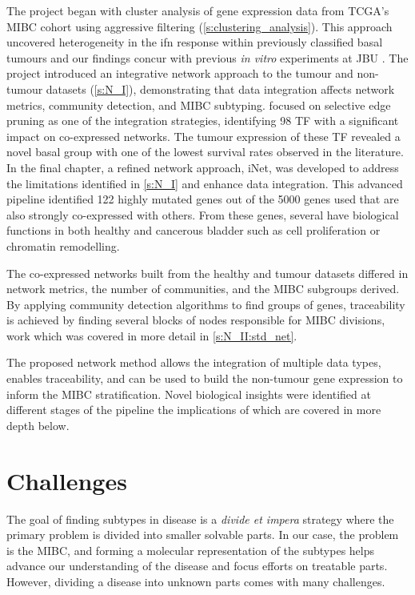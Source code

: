 The project began with cluster analysis of gene expression data from TCGA's MIBC cohort using aggressive filtering (\cref{s:clustering_analysis}). This approach uncovered heterogeneity in the \acrlong{ifn} response within previously classified basal tumours \citep{Robertson2017-mg, Kamoun2020-tj} and our findings concur with previous \textit{in vitro} experiments at JBU \citep{Baker2022-bj}. The project introduced an integrative network approach to the tumour and non-tumour datasets (\cref{s:N_I}), demonstrating that data integration affects network metrics, community detection, and MIBC subtyping.  focused on selective edge pruning as one of the integration strategies, identifying 98 TF with a significant impact on co-expressed networks. The tumour expression of these TF revealed a novel basal group with one of the lowest survival rates observed in the literature. In the final chapter, a refined network approach, iNet, was developed to address the limitations identified in \cref{s:N_I} and enhance data integration. This advanced pipeline identified 122 highly mutated genes out of the 5000 genes used that are also strongly co-expressed with others. From these genes, several have biological functions in both healthy and cancerous bladder such as cell proliferation or chromatin remodelling. 

The co-expressed networks built from the healthy and tumour datasets differed in network metrics, the number of communities, and the MIBC subgroups derived. By applying community detection algorithms to find groups of genes, traceability is achieved by finding several blocks of nodes responsible for MIBC divisions, work which was covered in more detail in \cref{s:N_II:std_net}.

% 
The proposed network method allows the integration of multiple data types, enables traceability, and can be used to build the non-tumour gene expression to inform the MIBC stratification. Novel biological insights were identified at different stages of the pipeline the implications of which are covered in more depth below.

\section{Challenges}

The goal of finding subtypes in disease is a \textit{divide et impera} strategy where the primary problem is divided into smaller solvable parts. In our case, the problem is the MIBC, and forming a molecular representation of the subtypes helps advance our understanding of the disease and focus efforts on treatable parts. However, dividing a disease into unknown parts comes with many challenges. 

